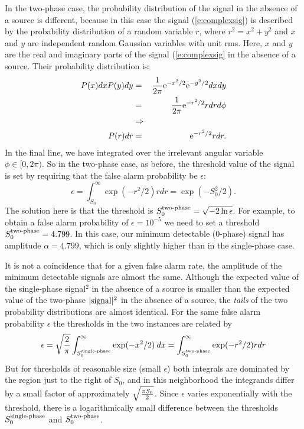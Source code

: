 In the two-phase case, the probability distribution of the signal in
the absence of a source is different, because in this case the signal
(\ref{e:complexsig}) is described by the probability distribution of
a random variable $r$, where $r^2 = x^2 + y^2$ and $x$ and $y$ are
independent random Gaussian variables with unit rms.   Here, $x$ and
$y$ are the real and imaginary parts of the signal (\ref{e:complexsig}
in the absence of a source.  Their probability distribution is:
\begin{eqnarray}
\nonumber
P(x) dx P(y) dy & = & {1 \over 2 \pi} {\rm e}^{-x^2/2} {\rm e}^{-y^2/2} dx dy \\
                & = & {1 \over 2 \pi} {\rm e}^{-r^2/2} r dr d\phi \\
\nonumber
   & \Rightarrow  &\\
   P(r)dr & = &  {\rm e}^{-r^2/2} r dr.
\end{eqnarray}
In the final line, we have integrated over the irrelevant angular variable
$\phi \in [0,2\pi)$.  So in the two-phase case, as before, the threshold value of the
signal is set by requiring that the false alarm probability be $\epsilon$:
\begin{equation}
\epsilon=\int_{S_0}^\infty \exp(-r^2/2) r dr = \exp({-S_0^2/2}).
\end{equation}
The solution here is that the threshold is
$S^{\small \textrm{two-phase}}_0 = \sqrt{-2  \ln
\epsilon}$.  For example, to obtain a false alarm probability of $\epsilon
= 10^{-5}$ we need to set a threshold $S^{\small \textrm{two-phase}}_0 = 4.799$.  In this case,
our minimum detectable (0-phase) signal has amplitude $\alpha = 4.799$,
which is only slightly higher than in the single-phase case.

It is not a coincidence that for a given false alarm rate, the amplitude
of the minimum detectable signals are almost the same.  Although the
expected value of the single-phase signal${}^2$ in the absence of a source
is smaller than the expected value of the two-phase $|{\rm signal}|^2$
in the absence of a source, the {\it tails} of the two probability
distributions are almost identical.  For the same false alarm probability
$\epsilon$ the thresholds in the two instances are related by
\begin{equation}
\epsilon=
\sqrt{2 \over \pi} \int_{S^{\small \textrm{single-phase}}_0}^\infty \exp(-x^2/2) \>dx
=
\int_{S^{\small \textrm{two-phase}}_0}^\infty \exp(-r^2/2) r dr
\end{equation}
But for thresholds of reasonable size (small $\epsilon$) both integrals
are dominated by the region just to the right of $S_0$, and in this neighborhood the
integrands differ by a small factor of approximately $\sqrt{\pi S_0 \over 2}$.
Since $\epsilon$ varies exponentially with the threshold, there is a logarithmically
small difference between the thresholds $S^{\small \textrm{single-phase}}_0$ and
$S^{\small \textrm{two-phase}}_0$.

